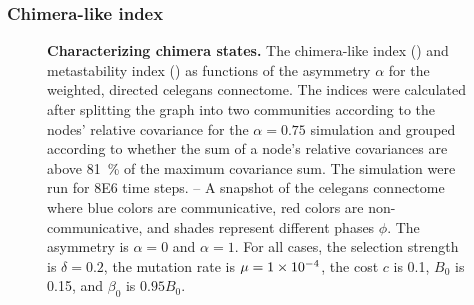\documentclass[pdflatex,lineno,referee,sn-nature]{sn-jnl}
\begin{document}
\subsubsection{Chimera-like index}
\begin{figure}
  \centering
  \pgfplotsset{width=0.4\textwidth}
  \begin{subcaptiongroup}
      {\label{fig:graph_celegans_asymmetry1}\captiontext*{}}{%
      {\label{fig:graph_celegans_asymmetry0}\captiontext*{}}{%
      {\label{fig:metastability_index}\captiontext*{}}{%
      {\label{fig:chimera_index}\captiontext*{}}{%
    {}%
  }}}}
  \end{subcaptiongroup}
  \caption{
    \textbf{
      Characterizing chimera states.
    }
    The chimera-like index ()
    and
    metastability index ()
    as functions of the asymmetry $\alpha$
    for the
    weighted, directed \gls{celegans} connectome.
    The indices were calculated after splitting the graph
    into two communities according to the nodes' relative covariance
    for the $\alpha = \num{0.75}$ simulation
    and grouped according to whether the sum
    of a node's relative covariances are above
    \SI{81}{\percent} of the maximum covariance sum.
    The simulation were run for \num{8E6} time steps.
    --
    A snapshot of the \gls{celegans} connectome where
    blue colors are communicative,
    red colors are non-communicative,
    and shades represent different phases $\phi$.
    The asymmetry is
    $\alpha = 0$
    and
    $\alpha = 1$.
    For all cases,
    the selection strength is $\delta=0.2$,
    the mutation rate is $\mu=\num{1E-4}$,
    the cost $c$ is \num{0.1},
    $B_0$ is \num{0.15},
    and
    $\beta_0$ is $\num{0.95} B_0$.
  }
  \label{fig:chimera-index}
\end{figure}
\end{document}
